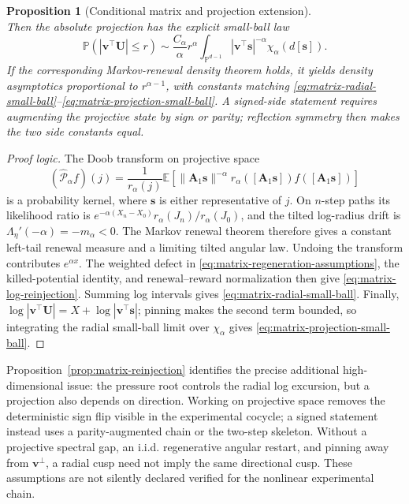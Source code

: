 \documentclass[11pt]{article}
\newtheorem{proposition}[theorem]{Proposition}
\theoremstyle{definition}
\newcommand{\E}{\mathbb E}
\newcommand{\Pp}{\mathbb P}
\newcommand{\svec}{\mathbf s}
\newcommand{\vvec}{\mathbf v}
\newcommand{\Avec}{\mathbf A}
\begin{document}
\begin{proposition}[Conditional matrix and projection extension]
\begin{equation}
 \label{eq:pinned-projection-condition}
\end{equation}
Then the absolute projection has the explicit small-ball law
\begin{equation}
 \Pp(|\vvec^\top\mathbf U|\leq r)
 \sim\frac{C_\alpha}{\alpha}r^\alpha
 \int_{\mathbb P^{d-1}}|\vvec^\top\svec|^{-\alpha}
 \chi_\alpha(d[\svec]).
 \label{eq:matrix-projection-small-ball}
\end{equation}
If the corresponding Markov-renewal density theorem holds, it yields density
asymptotics proportional to $r^{\alpha-1}$, with constants matching
\eqref{eq:matrix-radial-small-ball}--\eqref{eq:matrix-projection-small-ball}.
A signed-side statement
requires augmenting the projective state by sign or parity; reflection
symmetry then makes the two side constants equal.
\end{proposition}

\begin{proof}[Proof logic]
The Doob transform on projective space
\begin{equation}
 (\widehat{\mathcal P}_\alpha f)(j)
 =\frac1{r_\alpha(j)}
 \E\!\left[
   \|\Avec_1\svec\|^{-\alpha}
   r_\alpha([\Avec_1\svec])
   f([\Avec_1\svec])
 \right]
 \label{eq:projective-doob-transform}
\end{equation}
is a probability kernel, where $\svec$ is either representative of $j$.  On
$n$-step paths its likelihood ratio is
$e^{-\alpha(X_n-X_0)}r_\alpha(J_n)/r_\alpha(J_0)$, and the tilted
log-radius drift is
$\Lambda_\eta'(-\alpha)=-m_\alpha<0$.  The Markov renewal theorem
\cite{Kesten1974,NeyNummelin1987I,NeyNummelin1987II} therefore gives a
constant left-tail renewal measure and a limiting tilted angular law.
Undoing the transform contributes $e^{\alpha x}$.  The weighted defect in
\eqref{eq:matrix-regeneration-assumptions}, the killed-potential identity,
and renewal--reward normalization then give
\eqref{eq:matrix-log-reinjection}.  Summing log intervals gives
\eqref{eq:matrix-radial-small-ball}.  Finally,
$\log|\vvec^\top\mathbf U|=X+\log|\vvec^\top\svec|$; pinning makes the
second term bounded, so integrating the radial small-ball limit over
$\chi_\alpha$ gives \eqref{eq:matrix-projection-small-ball}.
\end{proof}

Proposition~\ref{prop:matrix-reinjection} identifies the precise additional
high-dimensional issue: the pressure root controls the radial log excursion,
but a projection also depends on direction.  Working on projective space
removes the deterministic sign flip visible in the experimental cocycle; a
signed statement instead uses a parity-augmented chain or the two-step
skeleton.  Without a projective spectral gap, an i.i.d. regenerative angular
restart, and pinning away from $\vvec^\perp$, a radial cusp need not imply the
same directional cusp.
These assumptions are not silently declared verified for the nonlinear
experimental chain.
\end{document}

